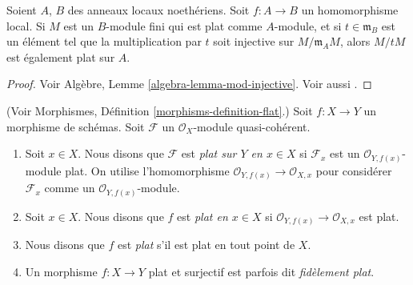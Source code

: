 \begin{theorem}
\label{theorem-flatness-grothendieck}
Soient $A$, $B$ des anneaux locaux noethériens.
Soit $f : A \to B$ un homomorphisme local.
Si $M$ est un $B$-module fini qui est plat comme $A$-module,
et si $t \in \mathfrak m_B$ est un élément tel que la multiplication
par $t$ soit injective sur $M/\mathfrak m_AM$, alors $M/tM$ est également plat sur $A$.
\end{theorem}

\begin{proof}
Voir Algèbre, Lemme \ref{algebra-lemma-mod-injective}.
Voir aussi \cite[Section 20]{MatCA}.
\end{proof}

\begin{definition}
\label{definition-flat-schemes}
(Voir Morphismes, Définition \ref{morphisms-definition-flat}.)
Soit $f : X \to Y$ un morphisme de schémas.
Soit $\mathcal{F}$ un $\mathcal{O}_X$-module quasi-cohérent.
\begin{enumerate}
\item Soit $x \in X$. Nous disons que $\mathcal{F}$ est
{\it plat sur $Y$ en $x \in X$} si $\mathcal{F}_x$
est un $\mathcal{O}_{Y, f(x)}$-module plat.
On utilise l'homomorphisme $\mathcal{O}_{Y, f(x)} \to \mathcal{O}_{X, x}$ pour
considérer $\mathcal{F}_x$ comme un $\mathcal{O}_{Y, f(x)}$-module.
\item Soit $x \in X$. Nous disons que $f$ est {\it plat en $x \in X$}
si $\mathcal{O}_{Y, f(x)} \to \mathcal{O}_{X, x}$ est plat.
\item Nous disons que $f$ est {\it plat} s'il est plat en tout point de $X$.
\item Un morphisme $f : X \to Y$ plat et surjectif est parfois
dit {\it fidèlement plat}.
\end{enumerate}
\end{definition}


